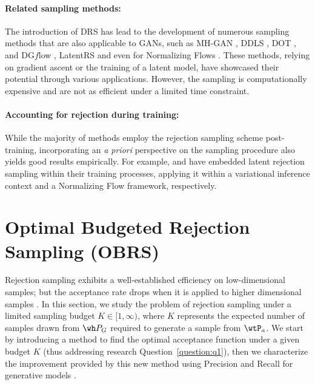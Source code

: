 \documentclass[twoside]{article}
\begin{document}
\paragraph{Related sampling methods:} The introduction of DRS has lead to the development of numerous sampling methods that are also applicable to GANs, such as MH-GAN \citep{turner_metropolis-hastings_2019}, DDLS \citep{che_your_2021}, DOT \citep{tanaka_discriminator_2019}, and DG$f$low \citep{ansari_refining_2021}, LatentRS \citep{issenhuth_latent_2022} and even for Normalizing Flows \citep{stimper_resampling_2022}. These methods, relying on gradient ascent or the training of a latent model, have showcased their potential through various applications. However, the sampling is computationally expensive and are not as efficient under a limited time constraint.    
\paragraph{Accounting for rejection during training:} While the majority of methods employ the rejection sampling scheme post-training, incorporating an \textit{a priori} perspective on the sampling procedure also yields good results empirically. For example, \citet{grover_variational_2018} and  \citet{stimper_resampling_2022} have embedded latent rejection sampling within their training processes, applying it within a variational inference context and a Normalizing Flow framework, respectively. 





\section{Optimal Budgeted Rejection Sampling (OBRS)}
\label{sec:optirej}
Rejection sampling exhibits a well-established efficiency on low-dimensional samples; but the acceptance rate drops when it is applied to higher dimensional samples \citep{mackay_information_2005}. In this section, we study the problem of rejection sampling under a limited sampling budget $K \in [1, \infty)$, where $K$ represents the expected  number of samples drawn from $\wh P_G$ required to generate a sample from $\wtP_a$. We start by introducing a method to find the optimal acceptance function under a given budget $K$ (thus addressing research Question~\ref{question:q1}), then  we characterize the improvement provided by this new method using  Precision and Recall for generative models \citep{sajjadi_assessing_2018}. 
\end{document}
